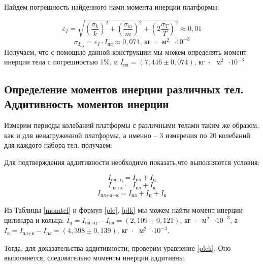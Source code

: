 	Найдем погрешность найденного нами момента инерции платформы:
	
	\begin{equation}
		\varepsilon_I = \sqrt{ \left(\frac{\sigma_k}{k}\right)^2 +\left(\frac{\sigma_m}{m}\right)^2 + \left(2\frac{\sigma_T}{T}\right)^2} \approx 0,01
	\end{equation}
	\begin{equation}
		\sigma_{I_\text{пл}} = \varepsilon_I \cdot I_\text{пл} \approx 0,074 \text{,  кг $\cdot$ $\text{м}^2$ $\cdot 10^{-3}$}
	\end{equation}
	Получаем, что с помощью данной конструкции мы можем определять момент инерции тела с погрешностью 1\%, и $I_\text{пл} = \left(7,446 \pm 0,074\right) \text{,  кг $\cdot$ $\text{м}^2$ $\cdot 10^{-3}$}$
	
	\subsection{Определение моментов инерции различных тел. Аддитивность моментов инерции}
	
	Измерим периоды колебаний платформы с различными телами таким же образом, как и для ненагруженной платформы, а именно -- 3 измерения по 20 колебаний для каждого набора тел, получаем:
	

	Для подтверждения аддитивности необходимо показать,что выполняются условия:
	
	
	\begin{equation} \label{plc}
		I_\text{пл+ц} = I_\text{пл} + I_\text{ц}
	\end{equation}
	\begin{equation}\label{plk}
		I_\text{пл+к} = I_\text{пл} + I_\text{к}
	\end{equation}
	\begin{equation}
		I_\text{пл+ц+к} = I_\text{пл} + I_\text{ц} + I_\text{к}
		\label{plck}
	\end{equation}
	
	
	Из Таблицы \eqref{momtel} и формул \eqref{plc}, \eqref{plk} мы можем найти момент инерции цилиндра и кольца: $I_\text{ц} = I_\text{пл+ц} - I_\text{пл} = \left(2,109 \pm 0,121\right) \text{,  кг $\cdot$ $\text{м}^2$ $\cdot 10^{-3}$}$, а $I_\text{к} = I_\text{пл+к} - I_\text{пл} = \left(4,398 \pm 0,139\right) \text{,  кг $\cdot$ $\text{м}^2$ $\cdot 10^{-3}$}$. 
	
	Тогда, для доказательства аддитивности, проверим уравнение \eqref{plck}. Оно выполняется, следовательно моменты инерции аддитивны.
	
